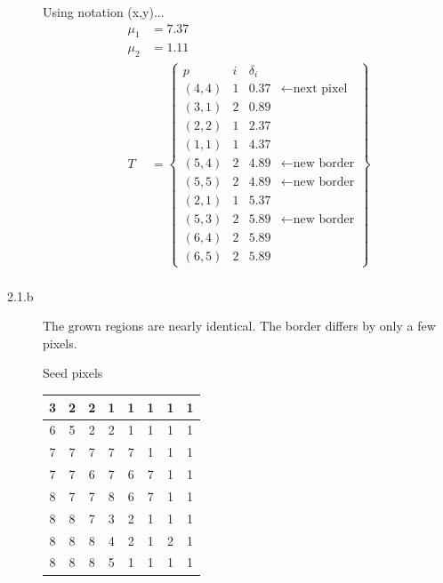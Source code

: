 \documentclass[fleqn]{article}
\begin{document}
\begin{description}
    Using notation (x,y)...
    \begin{align*}
        \mu_1 &= 7.37 \\
        \mu_2 &= 1.11 \\
        T &= \begin{Bmatrix}
                p     & i & \delta_i \\
                (4,4) & 1 & 0.37 & \gets \text{next pixel} \\
                (3,1) & 2 & 0.89 \\
                (2,2) & 1 & 2.37 \\
                (1,1) & 1 & 4.37 \\
                (5,4) & 2 & 4.89 & \gets \text{new border} \\
                (5,5) & 2 & 4.89 & \gets \text{new border} \\
                (2,1) & 1 & 5.37 \\
                (5,3) & 2 & 5.89 & \gets \text{new border} \\
                (6,4) & 2 & 5.89 \\
                (6,5) & 2 & 5.89
            \end{Bmatrix} \\
    \end{align*}

\item [2.1.b]
    The grown regions are nearly identical. The border differs by only a few pixels.

    Seed pixels

    \begin{tabular}{| c | c | c | c | c | c | c | c |}
        \hline
        3 & 2 & 2 & 1 & 1 & 1 & 1 & \cellcolor{orange} 1 \\ \hline
        6 & 5 & 2 & 2 & 1 & 1 & 1 & 1 \\ \hline
        7 & 7 & 7 & 7 & 7 & 1 & 1 & 1 \\ \hline
        7 & 7 & 6 & 7 & 6 & 7 & 1 & 1 \\ \hline
        8 & 7 & 7 & 8 & 6 & 7 & 1 & 1 \\ \hline
        8 & 8 & 7 & 3 & 2 & 1 & 1 & 1 \\ \hline
        8 & 8 & 8 & 4 & 2 & 1 & 2 & 1 \\ \hline
        \cellcolor{green} 8 & 8 & 8 & 5 & 1 & 1 & 1 & 1 \\ \hline
    \end{tabular}


\end{description}
\end{document}
